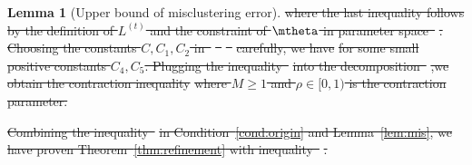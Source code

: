 \documentclass[lettersize,onecolumn,journal]{IEEEtran}
\theoremstyle{definition}
\newtheorem{lem}{Lemma}
\theoremstyle{definition}
\providecommand{\DIFdeltex}[1]{{\protect\color{red}\sout{#1}}}                      %
\providecommand{\DIFdel}[1]{\texorpdfstring{\DIFdeltex{#1}}{}} %
\begin{document}
\begin{lem}[Upper bound of misclustering error]
\DIFdel{where the last inequality follows by the definition of $L^{(t)}$ and the constraint of $\mtheta$ in parameter space~}%
\DIFdel{. Choosing the constants $C, C_1, C_2$ in~}%
\DIFdel{~}%
\DIFdel{~}%
\DIFdel{carefully, we have 
    }%
\DIFdel{for some small positive constants $C_4, C_5$. Plugging the inequality~}%
\DIFdel{into the decomposition~}%
\DIFdel{,we obtain the contraction inequality 
    }%
\DIFdel{where $M \geq 1$ and $\rho \in [0,1)$ is the contraction parameter. 
     }%

\DIFdel{Combining the inequality~}%
\DIFdel{in Condition~\ref{cond:origin} and Lemma~\ref{lem:mis}, we have proven Theorem~\ref{thm:refinement} with inequality~}%
\DIFdel{.
    }%




\end{lem}
\end{document}
